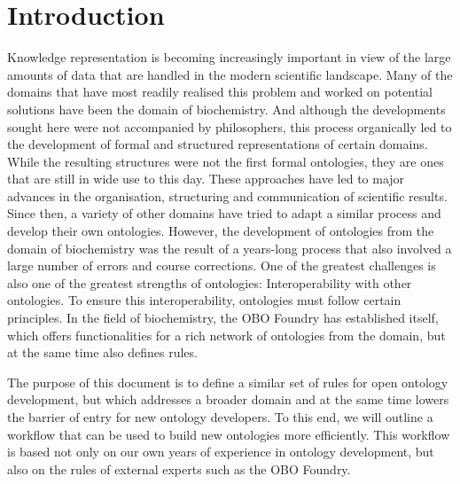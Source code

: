 \section{Introduction}
\label{introduction}

Knowledge representation is becoming increasingly important in view of the large amounts of data that are handled in the modern scientific landscape. Many of the domains that have most readily realised this problem and worked on potential solutions have been the domain of biochemistry. And although the developments sought here were not accompanied by philosophers, this process organically led to the development of formal and structured representations of certain domains. While the resulting structures were not the first formal ontologies, they are ones that are still in wide use to this day.
These approaches have led to major advances in the organisation, structuring and communication of scientific results. Since then, a variety of other domains have tried to adapt a similar process and develop their own ontologies. However, the development of ontologies from the domain of biochemistry was the result of a years-long process that also involved a large number of errors and course corrections. One of the greatest challenges is also one of the greatest strengths of ontologies: Interoperability with other ontologies. To ensure this interoperability, ontologies must follow certain principles. In the field of biochemistry, the OBO Foundry has established itself, which offers functionalities for a rich network of ontologies from the domain, but at the same time also defines rules.

The purpose of this document is to define a similar set of rules for open ontology development, but which addresses a broader domain and at the same time lowers the barrier of entry for new ontology developers. To this end, we will outline a workflow that can be used to build new ontologies more efficiently. This workflow is based not only on our own years of experience in ontology development, but also on the rules of external experts such as the OBO Foundry.

